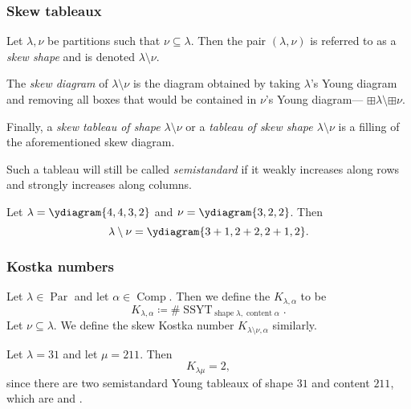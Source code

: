 \documentclass{article}
\DeclareMathOperator{\shape}{shape}
\DeclareMathOperator{\content}{content}
\DeclareMathOperator{\Par}{Par}
\DeclareMathOperator{\Com}{Comp}
\DeclareMathOperator{\SSYT}{SSYT}
\begin{document}
\subsubsection{Skew tableaux}

\begin{definition}
    Let $\lambda, \nu$ be partitions such that $\nu \subseteq \lambda$. Then the pair $(\lambda, \nu)$ is referred to as a \textit{skew shape} and is denoted $\lambda \setminus \nu$.

    The \textit{skew diagram} of $\lambda \setminus \nu$ is the diagram obtained by taking $\lambda$'s Young diagram and removing all boxes that would be contained in $\nu$'s Young diagram--- $\boxplus \lambda \setminus \boxplus \nu$.

    Finally, a \textit{skew tableau of shape $\lambda \setminus \nu$} or a \textit{tableau of skew shape $\lambda \setminus \nu$} is a filling of the aforementioned skew diagram. 

    Such a tableau will still be called \textit{semistandard} if it weakly increases along rows and strongly increases along columns.
\end{definition}

\begin{example} 
    \ytabsmallbox
    Let $\lambda = \ydiagram{4,4,3,2}$ and $\nu = \ydiagram{3,2,2}$.
    Then 
    \ytabnormalbox
    \[\lambda \setminus \nu = \ydiagram{3+1,2+2,2+1,2}.\]
\end{example}

\subsubsection{Kostka numbers}

\begin{definition}
    Let $\lambda \in \Par$ and let $\alpha \in \Com$.
    Then we define the  $K_{\lambda,\alpha}$ to be
    \[
        K_{\lambda,\alpha} \coloneq \#\SSYT_{\shape \lambda, \content \alpha}.
    \]
    Let $\nu \subseteq \lambda$. We define the skew Kostka number $K_{\lambda\setminus\nu,\alpha}$ similarly.
\end{definition}

\begin{example}
    Let $\lambda = 31$ and let $\mu = 211$.
    Then
    \[
        K_{\lambda\mu} = 2,
    \]
    since there are two semistandard Young tableaux of shape $31$ and content $211$, which are \ytabsmallbox{} and .
\end{example}
\end{document}
